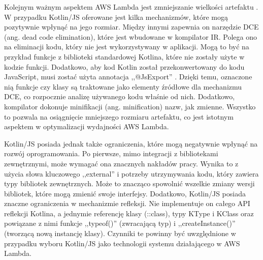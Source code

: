 Kolejnym ważnym aspektem AWS Lambda jest zmniejszanie wielkości artefaktu \cite{8116416}\cite{9095731}.
W przypadku Kotlin/JS oferowane jest kilka mechanizmów, które mogą pozytywnie wpłynąć na jego rozmiar.
Między innymi zapewnia on narzędzie DCE (ang. dead code elimination), które jest wbudowane w kompilator IR.
Polega ono na eliminacji kodu, który nie jest wykorzystywany w aplikacji.
Mogą to być na przykład funkcje z biblioteki standardowej Kotlina, które nie zostały użyte w kodzie funkcji.
Dodatkowo, aby kod Kotlin został przekonwertowany do kodu JavaScript, musi zostać użyta annotacja ,,@JsExport'' \cite{kotlinlangKotlinDocs}.
Dzięki temu, oznaczone nią funkcje czy klasy są traktowane jako elementy źródłowe dla mechanizmu DCE, co rozpocznie analizę używanego kodu właśnie od nich.
Dodatkowo, kompilator dokonuje minifikacji (ang. minification) nazw, jak zmienne.
Wszystko to pozwala na osiągnięcie mniejszego rozmiaru artefaktu, co jest istotnym aspektem w optymalizacji wydajności AWS Lambda.

Kotlin/JS posiada jednak także ograniczenia, które mogą negatywnie wpłynąć na rozwój oprogramowania.
Po pierwsze, mimo integracji z bibliotekami zewnętrznymi, może wymagać ona znacznych nakładów pracy.
Wynika to z użycia słowa kluczowego ,,external'' i potrzeby utrzymywania kodu, który zawiera typy bibliotek zewnętrznych.
Może to znacząco spowolnić wszelkie zmiany wersji bibliotek, które mogą zmienić swoje interfejsy.
Dodatkowo, Kotlin/JS posiada znaczne ograniczenia w mechanizmie refleksji.
Nie implementuje on całego API reflekcji Kotlina, a jednymie referencję klasy (::class), typy KType i KClass oraz powiązane z nimi funkcje ,,typeof()'' (zwracającą typ) i ,,createInstance()'' (tworzącą nową instancję klasy).
Czynniki te powinny być uwzględnione w przypadku wyboru Kotlin/JS jako technologii systemu działającego w AWS Lambda.






